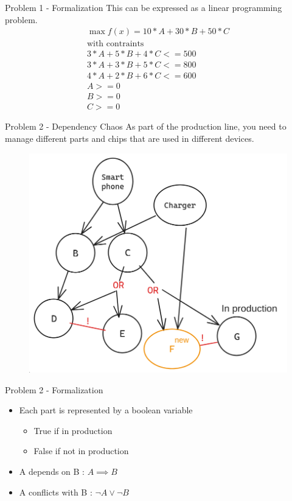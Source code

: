\documentclass[t, ]{beamer}
\begin{document}
\begin{frame}{Problem 1 - Formalization}
	This can be expressed as a linear programming problem.  
	\begin{align}
		\max f(x) = 10 * A + 30 * B + 50 * C \\
		\text{with contraints}\\
		3*A + 5*B+ 4*C <= 500 \\
		3*A + 3*B + 5*C <= 800 \\
		4*A + 2*B + 6*C <= 600 \\
		A>=0 \\
		B>=0 \\
		C>=0
	\end{align}
\end{frame}

\begin{frame}{Problem 2 - Dependency Chaos}
	As part of the production line, you need to manage different parts and chips that are used in different devices.
	\begin{figure}
		\includegraphics[scale=0.25]{../Images/deps.png}
	\end{figure}
\end{frame}

\begin{frame}{Problem 2 - Formalization}
	\begin{itemize}
		\item Each part is represented by a boolean variable
		\begin{itemize}
			\item True if in production
			\item False if not in production
		\end{itemize}
		\item A depends on B : $A \implies B$
		\item A conflicts with B : $\neg A \lor \neg B$
	\end{itemize}
\end{frame}
\end{document}
